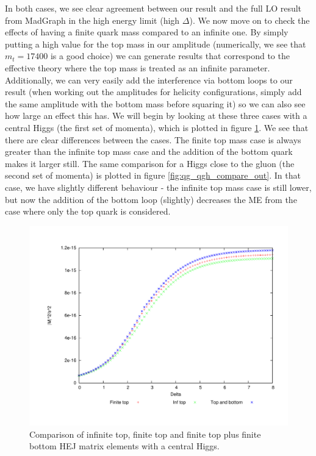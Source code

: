 In both cases, we see clear agreement between our result and the full LO result from MadGraph in the high energy limit (high $\Delta$). We now move on to check the effects of having a finite quark mass compared to an infinite one. By simply putting a high value for the top mass in our amplitude (numerically, we see that $m_t = 17400$ is a good choice) we can generate results that correspond to the effective theory where the top mass is treated as an infinite parameter. Additionally, we can very easily add the interference via bottom loops to our result (when working out the amplitudes for helicity configurations, simply add the same amplitude with the bottom mass before squaring it) so we can also see how large an effect this has. We will begin by looking at these three cases with a central Higgs (the first set of momenta), which is plotted in figure \ref{fig:qg_qgh_compare}. We see that there are clear differences between the cases. The finite top mass case is always greater than the infinite top mass case and the addition of the bottom quark makes it larger still. The same comparison for a Higgs close to the gluon (the second set of momenta) is plotted in figure \ref{fig:qg_qgh_compare_out}. In that case, we have slightly different behaviour - the infinite top mass case is still lower, but now the addition of the bottom loop (slightly) decreases the ME from the case where only the top quark is considered. 
\begin{figure}[t]
\centering
\includegraphics[scale=0.5]{Images/qg_qgH_compare_central.pdf}
\caption{Comparison of infinite top, finite top and finite top plus finite bottom HEJ matrix elements with a central Higgs.}
\label{fig:qg_qgh_compare}
\end{figure}

